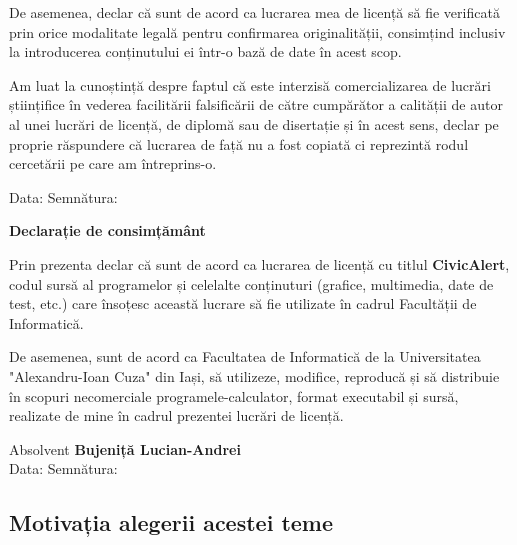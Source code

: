 \documentclass[12pt,a4paper]{report}
\begin{document}
De asemenea, declar că sunt de acord ca lucrarea mea de licență să fie verificată prin orice modalitate legală pentru confirmarea originalității, consimțind inclusiv la introducerea conținutului ei într-o bază de date în acest scop.

Am luat la cunoștință despre faptul că este interzisă comercializarea de lucrări științifice în vederea facilitării falsificării de către cumpărător a calității de autor al unei lucrări de licență, de diplomă sau de disertație și în acest sens, declar pe proprie răspundere că lucrarea de față nu a fost copiată ci reprezintă rodul cercetării pe care am întreprins-o.

\begin{flushright}
    Data: \dotfill \hspace{6cm} Semnătura: \dotfill
\end{flushright}

\vspace*{\fill}

\newpage
\thispagestyle{empty}
\vspace*{\fill}
\begin{center}
    \large
    \textbf{Declarație de consimțământ}
\end{center}

Prin prezenta declar că sunt de acord ca lucrarea de licență cu titlul \textbf{CivicAlert}, codul sursă al programelor și celelalte conținuturi (grafice, multimedia, date de test, etc.) care însoțesc această lucrare să fie utilizate în cadrul Facultății de Informatică.

De asemenea, sunt de acord ca Facultatea de Informatică \space de la Universitatea "Alexandru-Ioan Cuza" din Iași, să utilizeze, modifice, reproducă și să distribuie în scopuri necomerciale programele-calculator, format executabil și sursă, realizate de mine în cadrul prezentei lucrări de licență.

\begin{flushright}
    Absolvent \textbf{Bujeniță Lucian-Andrei} \\
    \vspace{0.5cm}
    Data: \dotfill \hspace{6cm} Semnătura: \dotfill
\end{flushright}
\vspace*{\fill}



\newpage
\setcounter{page}{1} 
\tableofcontents
\newpage
\begin{center}
\section*{Motivația alegerii acestei teme}
\end{center}
\end{document}
